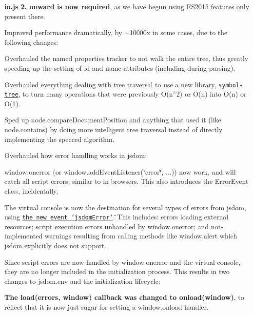 \begin{DoxyItemize}
\item {\bfseries io.\+js 2. onward is now required}, as we have begun using E\+S2015 features only present there.
\item Improved performance dramatically, by $\sim$10000x in some cases, due to the following changes\+:
\begin{DoxyItemize}
\item Overhauled the named properties tracker to not walk the entire tree, thus greatly speeding up the setting of {\ttfamily id} and {\ttfamily name} attributes (including during parsing).
\item Overhauled everything dealing with tree traversal to use a new library, \href{https://github.com/jsdom/js-symbol-tree}{\tt symbol-\/tree}, to turn many operations that were previously O(n$^\wedge$2) or O(n) into O(n) or O(1).
\item Sped up {\ttfamily node.\+compare\+Document\+Position} and anything that used it (like {\ttfamily node.\+contains}) by doing more intelligent tree traversal instead of directly implementing the specced algorithm.
\end{DoxyItemize}
\item Overhauled how error handling works in jsdom\+:
\begin{DoxyItemize}
\item {\ttfamily window.\+onerror} (or {\ttfamily window.\+add\+Event\+Listener(\char`\"{}error\char`\"{}, ...)}) now work, and will catch all script errors, similar to in browsers. This also introduces the {\ttfamily Error\+Event} class, incidentally.
\item The virtual console is now the destination for several types of errors from jsdom, using \href{https://github.com/tmpvar/jsdom#virtual-console-jsdomerror-error-reporting}{\tt the new event {\ttfamily \char`\"{}jsdom\+Error\char`\"{}}}. This includes\+: errors loading external resources; script execution errors unhandled by {\ttfamily window.\+onerror}; and not-\/implemented warnings resulting from calling methods like {\ttfamily window.\+alert} which jsdom explicitly does not support.
\item Since script errors are now handled by {\ttfamily window.\+onerror} and the virtual console, they are no longer included in the initialization process. This results in two changes to {\ttfamily jsdom.\+env} and the initialization lifecycle\+:
\begin{DoxyItemize}
\item {\bfseries The {\ttfamily load(errors, window)} callback was changed to {\ttfamily onload(window)}}, to reflect that it is now just sugar for setting a {\ttfamily window.\+onload} handler.

\end{DoxyItemize}
\end{DoxyItemize}
\end{DoxyItemize}
